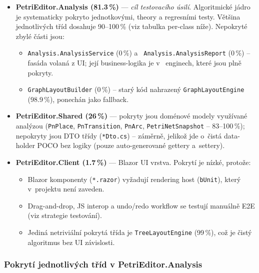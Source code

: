 \documentclass[12pt,a4paper]{article}
\begin{document}
\begin{itemize}
    \item \textbf{PetriEditor.Analysis (81.3\,\%)} — \emph{cíl
          testovacího úsilí}. Algoritmické jádro je systematicky pokryto
          jednotkovými, theory a regresními testy. Většina jednotlivých
          tříd dosahuje 90--100\,\% (viz tabulka per-class níže).
          Nepokryté zbylé části jsou:
          \begin{itemize}
              \item \texttt{Analysis.AnalysisService} (0\,\%) a~%
                    \texttt{Analysis.AnalysisReport} (0\,\%) --
                    fasáda volaná z UI; její business-logika je v~%
                    enginech, které jsou plně pokryty.
              \item \texttt{GraphLayoutBuilder} (0\,\%) -- starý kód
                    nahrazený \texttt{GraphLayoutEngine} (98.9\,\%),
                    ponechán jako fallback.
          \end{itemize}
    \item \textbf{PetriEditor.Shared (26\,\%)} — pokryty jsou doménové
          modely využívané analýzou (\texttt{PnPlace},
          \texttt{PnTransition}, \texttt{PnArc}, \texttt{PetriNetSnapshot} --
          83--100\,\%); nepokryty jsou DTO třídy
          (\texttt{*Dto.cs}) -- záměrně, jelikož jde o~čistá data-holder
          POCO bez logiky (pouze auto-generované gettery a~settery).
    \item \textbf{PetriEditor.Client (1.7\,\%)} — Blazor UI vrstva.
          Pokrytí je nízké, protože:
          \begin{itemize}
              \item Blazor komponenty (\texttt{*.razor}) vyžadují
                    rendering host (\texttt{bUnit}), který v~projektu
                    není zaveden.
              \item Drag-and-drop, JS interop a undo/redo workflow se
                    testují manuálně E2E (viz strategie testování).
              \item Jediná netriviální pokrytá třída je
                    \texttt{TreeLayoutEngine} (99\,\%), což je čistý
                    algoritmus bez UI závislosti.
          \end{itemize}
\end{itemize}

\subsubsection{Pokrytí jednotlivých tříd v PetriEditor.Analysis}
\end{document}
